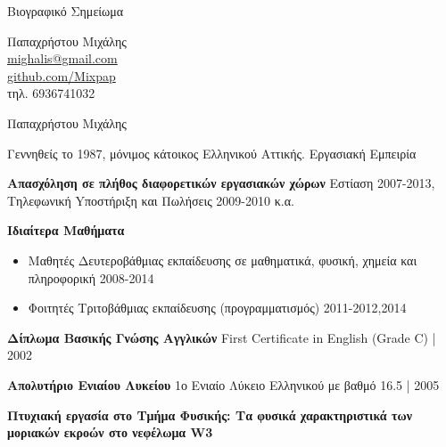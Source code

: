 \documentclass[a4paper,12pt,final]{memoir}
\newcommand{\SmallSep}{\vspace{0.25em}}
\newenvironment{AboutMe}
	{\ignorespaces\textbf{\color{RoyalBlue} \textbullet{}}}
\newcommand{\CVSection}[1]
	{\Large{#1}\par
	\SmallSep\normalsize\normalfont}
\newcommand{\CVItem}[2]
	{\textbf{\color{RoyalBlue} #1} #2}
\newcommand{\location}[1]{ %
\small{\color{headings}#1}}
\newenvironment{tightitemize} %
{\vspace{-\topsep}\begin{itemize}\itemsep1pt \parskip0pt \parsep0pt}
{\end{itemize}\vspace{-\topsep}}
\begin{document}
\begin{flushright}
Βιογραφικό Σημείωμα
\vspace{0.75cm}

\small
	Παπαχρήστου Μιχάλης \\
	\url{mighalis@gmail.com}  \\
	\url{github.com/Mixpap} \\
	τηλ. 6936741032
\end{flushright}\normalsize
\framebreak


\Huge {\color{RoyalBlue} Παπαχρήστου Μιχάλης} \\

\normalsize\normalfont

\begin{AboutMe}
Γεννηθείς το 1987, μόνιμος κάτοικος Ελληνικού Αττικής.
\end{AboutMe}

\CVSection{Εργασιακή Εμπειρία}

\SmallSep

\CVItem{Aπασχόληση σε πλήθος διαφορετικών εργασιακών χώρων}{\newline}
\location{Eστίαση 2007-2013, Tηλεφωνική Yποστήριξη και Πωλήσεις 2009-2010 κ.α.}


\CVItem{Ιδιαίτερα Μαθήματα}{}
\begin{tightitemize}
	\item Μαθητές Δευτεροβάθμιας εκπαίδευσης σε μαθηματικά, φυσική, χημεία και πληροφορική \location{2008-2014}
	\item Φοιτητές Τριτοβάθμιας εκπαίδευσης (προγραμματισμός)
	\location{2011-2012,2014}
\end{tightitemize}
\SmallSep

\CVItem{Δίπλωμα Βασικής Γνώσης Αγγλικών}{\newline}
\location{First Certificate in English (Grade C) | 2002}
\SmallSep

\CVItem{Απολυτήριο Ενιαίου Λυκείου}{\newline}
\location{1ο Ενιαίο Λύκειο Ελληνικού με βαθμό 16.5 | 2005}
\SmallSep

\CVItem{Πτυχιακή εργασία στο Τμήμα Φυσικής: Τα φυσικά χαρακτηριστικά των μοριακών εκροών στο νεφέλωμα W3 \newline}
\location{}
\SmallSep
\end{document}
